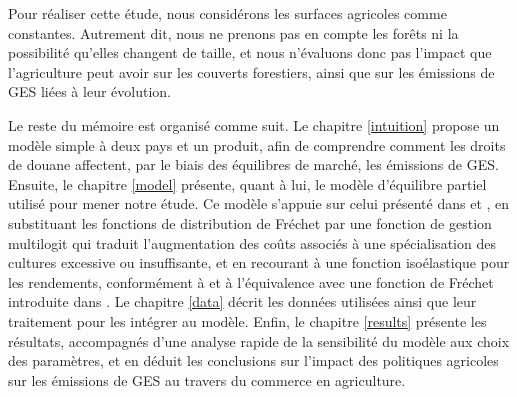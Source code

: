 Pour réaliser cette étude, nous considérons les surfaces agricoles comme constantes. Autrement dit, nous ne prenons pas en compte les forêts ni la possibilité qu'elles changent de taille, et nous n'évaluons donc pas l’impact que l’agriculture peut avoir sur les couverts forestiers, ainsi que sur les émissions de GES liées à leur évolution.

Le reste du mémoire est organisé comme suit. Le chapitre \ref{intuition} propose un modèle simple à deux pays et un produit, afin de comprendre comment les droits de douane affectent, par le biais des équilibres de marché, les émissions de GES. Ensuite, le chapitre \ref{model} présente, quant à lui, le modèle d’équilibre partiel utilisé pour mener notre étude. Ce modèle s’appuie sur celui présenté dans \cite{Gouel2021} et \cite{Gouel2025}, en substituant les fonctions de distribution de Fréchet par une fonction de gestion multilogit qui traduit l’augmentation des coûts associés à une spécialisation des cultures excessive ou insuffisante, et en recourant à une fonction isoélastique pour les rendements, conformément à \cite{Carpentier2013} et à l’équivalence avec une fonction de Fréchet introduite dans \cite{Gouel202x}. Le chapitre \ref{data} décrit les données utilisées ainsi que leur traitement pour les intégrer au modèle. Enfin, le chapitre \ref{results} présente les résultats, accompagnés d’une analyse rapide de la sensibilité du modèle aux choix des paramètres, et en déduit les conclusions sur l’impact des politiques agricoles sur les émissions de GES au travers du commerce en agriculture.


